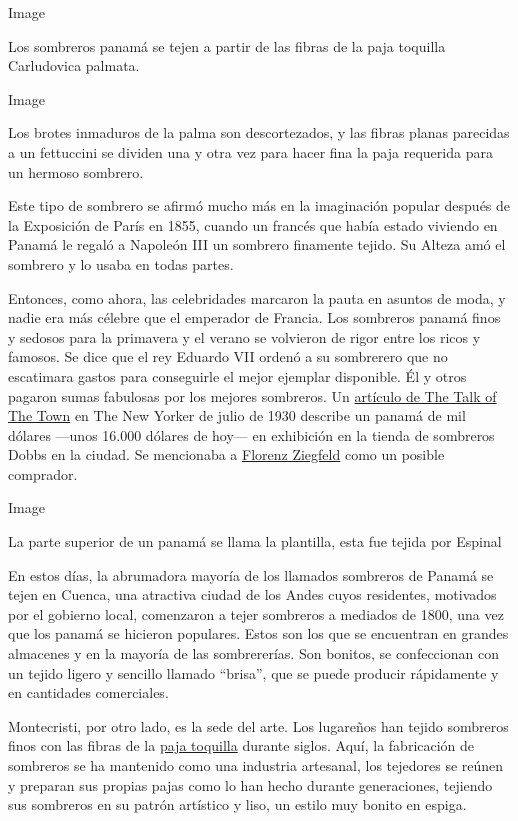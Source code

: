 Image

Los sombreros panamá se tejen a partir de las fibras de la paja
toquilla~ Carludovica palmata.

Image

Los brotes inmaduros de la palma son descortezados, y las fibras planas
parecidas a un fettuccini se dividen una y otra vez para hacer fina la
paja requerida para un hermoso sombrero.

Este tipo de sombrero se afirmó mucho más en la imaginación popular
después de la Exposición de París en 1855, cuando un francés que había
estado viviendo en Panamá le regaló a Napoleón III un sombrero finamente
tejido. Su Alteza amó el sombrero y lo usaba en todas partes.

Entonces, como ahora, las celebridades marcaron la pauta en asuntos de
moda, y nadie era más célebre que el emperador de Francia. Los sombreros
panamá finos y sedosos para la primavera y el verano se volvieron de
rigor entre los ricos y famosos. Se dice que el rey Eduardo VII ordenó a
su sombrerero que no escatimara gastos para conseguirle el mejor
ejemplar disponible. Él y otros pagaron sumas fabulosas por los mejores
sombreros. Un
\href{https://www.newyorker.com/magazine/1930/07/05/thousand-dollar-hats}{artículo
de The Talk of The Town} en The New Yorker de julio de 1930 describe un
panamá de mil dólares ---unos 16.000 dólares de hoy--- en exhibición en
la tienda de sombreros Dobbs en la ciudad. Se mencionaba a
\href{https://www.pbs.org/wnet/broadway/stars/florenz-ziegfeld/}{Florenz
Ziegfeld} como un posible comprador.

Image

La parte superior de un panamá se llama la plantilla, esta fue tejida
por Espinal

En estos días, la abrumadora mayoría de los llamados sombreros de Panamá
se tejen en Cuenca, una atractiva ciudad de los Andes cuyos residentes,
motivados por el gobierno local, comenzaron a tejer sombreros a mediados
de 1800, una vez que los panamá se hicieron populares. Estos son los que
se encuentran en grandes almacenes y en la mayoría de las sombrererías.
Son bonitos, se confeccionan con un tejido ligero y sencillo llamado
``brisa'', que se puede producir rápidamente y en cantidades
comerciales.

Montecristi, por otro lado, es la sede del arte. Los lugareños han
tejido sombreros finos con las fibras de la
\href{https://timesmachine.nytimes.com/timesmachine/1900/09/02/101066082.html?pageNumber=24}{paja
toquilla} durante siglos. Aquí, la fabricación de sombreros se ha
mantenido como una industria artesanal, los tejedores se reúnen y
preparan sus propias pajas como lo han hecho durante generaciones,
tejiendo sus sombreros en su patrón artístico y liso, un estilo muy
bonito en espiga.

